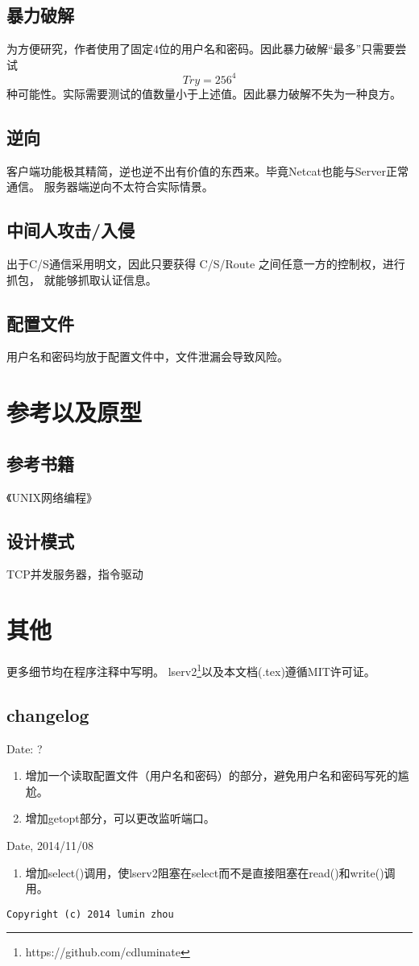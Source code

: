 \documentclass[a4paper,12pt]{article}
\begin{document}
\begin{CJK}{UTF8}{gbsn}
	\subsection{暴力破解}
		为方便研究，作者使用了固定4位的用户名和密码。因此暴力破解“最多”只需要尝试
		\begin{equation}
Try = 256^{4}
		\end{equation}
		种可能性。实际需要测试的值数量小于上述值。因此暴力破解不失为一种良方。
	\subsection{逆向}
		客户端功能极其精简，逆也逆不出有价值的东西来。毕竟Netcat也能与Server正常通信。
		服务器端逆向不太符合实际情景。
	\subsection{中间人攻击/入侵}
		出于C/S通信采用明文，因此只要获得 C/S/Route 之间任意一方的控制权，进行抓包，
		就能够抓取认证信息。
	\subsection{配置文件}
		用户名和密码均放于配置文件中，文件泄漏会导致风险。

\section{参考以及原型}
	\subsection{参考书籍}
		《UNIX网络编程》
	\subsection{设计模式}
		TCP并发服务器，指令驱动

\section{其他}
	更多细节均在程序注释中写明。
	lserv2\footnote{https://github.com/cdluminate}以及本文档(.tex)遵循MIT许可证。
	\subsection{changelog}
		Date: ?
		\begin{enumerate}
		\item 增加一个读取配置文件（用户名和密码）的部分，避免用户名和密码写死的尴尬。
		\item 增加getopt部分，可以更改监听端口。
		\end{enumerate}
		Date, 2014/11/08
		\begin{enumerate}
		\item 增加select()调用，使lserv2阻塞在select而不是直接阻塞在read()和write()调用。
		\end{enumerate}


	\begin{verbatim}
Copyright (c) 2014 lumin zhou
	\end{verbatim} 


\end{CJK}
\end{document}
